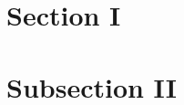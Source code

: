 \documentclass{beamer}
\begin{document}
\section{Section I}
\begin{frame}
\end{frame}

\section{Subsection II}
\begin{frame}
\end{frame}
\end{document}
